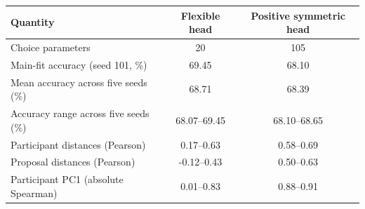 \begin{tabular}{p{7.3cm}cc}
\toprule
Quantity & Flexible head & Positive symmetric head \\
\midrule
Choice parameters & 20 & 105 \\
Main-fit accuracy (seed 101, \%) & 69.45 & 68.10 \\
Mean accuracy across five seeds (\%) & 68.71 & 68.39 \\
Accuracy range across five seeds (\%) & 68.07--69.45 & 68.10--68.65 \\
Participant distances (Pearson) & 0.17--0.63 & 0.58--0.69 \\
Proposal distances (Pearson) & -0.12--0.43 & 0.50--0.63 \\
Participant PC1 (absolute Spearman) & 0.01--0.83 & 0.88--0.91 \\
\bottomrule
\end{tabular}
